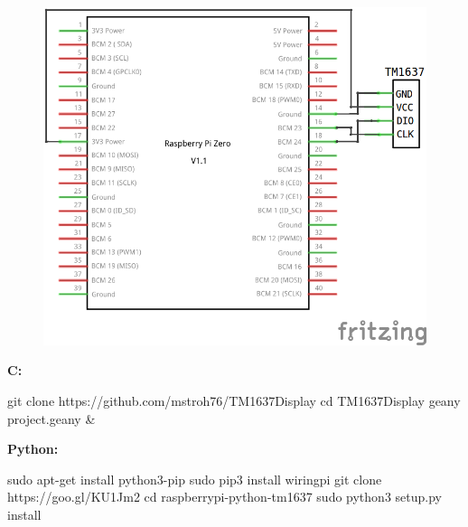 \begin{figure}[ht]
	\centering
	\includegraphics[scale=0.25]{images/TM1637_Schaltplan.png}	
	\label{TM1637}
\end{figure}


\textbf{C:} 

\begin{console}
git clone https://github.com/mstroh76/TM1637Display
cd TM1637Display
geany project.geany & 
\end{console}

\textbf{Python:}
\begin{console}
sudo apt-get install python3-pip
sudo pip3 install wiringpi
git clone https://goo.gl/KU1Jm2
cd raspberrypi-python-tm1637
sudo python3 setup.py install
\end{console}

\lstset{language=Python, caption=, 
        label=TM1637Program, frame=single, basicstyle=\ttfamily
	      \footnotesize, breakatwhitespace=false, showstringspaces=false, 
        showtabs=false, tabsize=2 }

